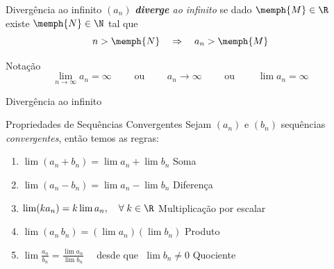 \begin{frame}{Divergência ao infinito}
    $(a_n)$ \emph{\textbf{diverge} ao infinito} se dado $\memph{M}\in\R$ existe $\memph{N}\in\N$ tal que
    \[ n>\memph{N} \quad \Rightarrow \quad a_n > \memph{M} \]

    \pause
    \vspace{\baselineskip}
    Notação
    \[ \lim_{n\to\infty} a_n=\infty
    \qquad\text{ ou }\qquad
    a_n\to \infty
    \qquad\text{ ou }\qquad
    \lim a_n=\infty
    \]

\end{frame}

\begin{frame}{Divergência ao infinito}
  \centering
  \scalebox{0.9}{}
\end{frame}

\begin{frame}{Propriedades de Sequências Convergentes}
    Sejam $(a_n)$ e $(b_n)$ sequências \emph{convergentes}, então temos as regras: \\[4mm]
    \pause
    \begin{enumerate}[<+->]
        \item $\lim (a_n+b_n) = \lim a_n + \lim b_n$                                                 \tabto{77mm} Soma                      \\[5mm]
        \item $\lim (a_n-b_n) = \lim a_n - \lim b_n$                                                 \tabto{77mm} Diferença                 \\[5mm]
        \item $\lim (k a_n)   = k\lim a_n,\quad \forall\; k\in\R$                                    \tabto{77mm} Multiplicação por escalar \\[5mm]
        \item $\lim (a_n\,b_n)= (\lim a_n)(\lim b_n)$                                                \tabto{77mm} Produto                   \\[5mm]
        \item \(\lim \frac{a_n}{b_n} = \frac{\lim a_n}{\lim b_n}\quad\) desde que $\;\lim b_n \neq 0$  \tabto{77mm} Quociente
    \end{enumerate}
\end{frame}

